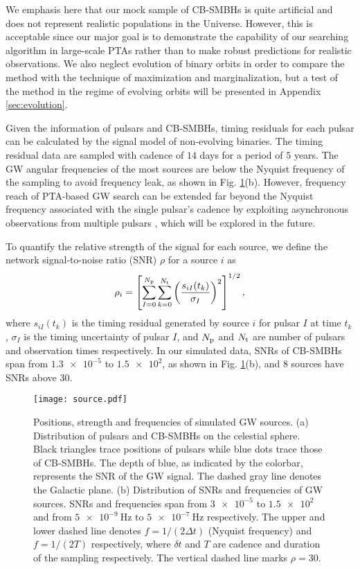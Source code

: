 \documentclass[times,tight]{aastex631}
\begin{document}
We emphasis here that our mock sample of CB-SMBHs is quite artificial and does not represent realistic populations in the Universe.
However, this is acceptable since our major goal is to demonstrate the capability of our searching algorithm in large-scale PTAs rather than to make robust predictions for realistic observations.
We also neglect evolution of binary orbits in order to compare the method with the technique of maximization and marginalization, but a test of the method in the regime of evolving orbits will be presented in Appendix \ref{sec:evolution}.

Given the information of pulsars and CB-SMBHs, timing residuals for each pulsar can be calculated by the signal model of non-evolving binaries.
The timing residual data are sampled with cadence of $14$ days for a period of $5$ years.
The GW angular frequencies of the most sources are below the Nyquist frequency of the sampling to avoid frequency leak, as shown in Fig. \ref{fig:source}(b).
However, frequency reach of PTA-based GW search can be extended far beyond the Nyquist frequency associated  with the single pulsar's cadence by exploiting asynchronous observations from multiple pulsars \citep{wang2021}, which will be explored in the future.

To quantify the relative strength of the signal for each source, we define the network signal-to-noise ratio (SNR) $\rho$ for a source $i$ as
\begin{equation}
    \rho_i = \left[\sum_{I=0}^{N_{\rm p}} \sum_{k=0}^{N_{\rm t}} \left(\frac{s_{iI}(t_k)}{\sigma_I}\right)^2\right]^{1/2},
\end{equation}
where $s_{iI}(t_k)$ is the timing residual generated by source $i$ for pulsar $I$ at time $t_k$, $\sigma_I$ is the timing uncertainty of pulsar $I$, and $N_{\rm p}$ and $N_{\rm t}$ are number of pulsars and observation times respectively. 
In our simulated data, SNRs of CB-SMBHs span from $\num{1.3e-5}$ to $\num{1.5e2}$, as shown in Fig. \ref{fig:source}(b), and $8$ sources have SNRs above $30$.

\begin{figure}
    \centering
    \texttt{[image: source.pdf]}
    \caption{Positions, strength and frequencies of simulated GW sources.
    (a) Distribution of pulsars and CB-SMBHs on the celestial sphere.
    Black triangles trace positions of pulsars while blue dots trace those of CB-SMBHs.
    The depth of blue, as indicated by the colorbar, represents the SNR of the GW signal.
    The dashed gray line denotes the Galactic plane.
    (b) Distribution of SNRs and frequencies of GW sources.
    SNRs and frequencies span from $\num{3e-5}$ to $\num{1.5e2}$ and from $\SI{5e-9}{\Hz}$ to $\SI{5e-7}{\Hz}$ respectively.
    The upper and lower dashed line denotes $f = 1/(2\Delta t)$ (Nyquist frequency) and $f = 1/(2T)$ respectively, where $\delta t$ and $T$ are cadence and duration of the sampling respectively. 
    The vertical dashed line marks $\rho = 30$.
    \label{fig:source}}
\end{figure}
\end{document}
